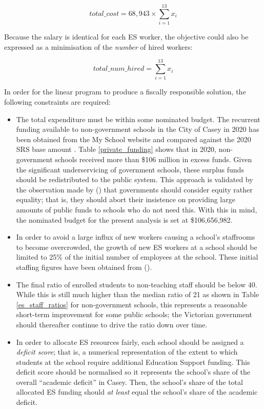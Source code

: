 \documentclass[11pt, a4paper]{article}
\begin{document}
    \begin{equation}
        total\_cost = 68,943 \times \sum_{i=1}^{13} x_i
    \end{equation}

    Because the salary is identical for each ES worker, the objective could also be expressed as a minimisation of the \textit{number} of hired workers:

    \begin{equation}
        total\_num\_hired = \sum_{i=1}^{13} x_i
    \end{equation}

    In order for the linear program to produce a fiscally responsible solution, the following constraints are required:

    \begin{itemize}
        \item The total expenditure must be within some nominated budget. The recurrent funding available to non-government schools in the City of Casey in 2020 has been obtained from the My School website \parencite{naplan} and compared against the 2020 SRS base amount \parencite{srs_2020}. Table \ref{private_funding} shows that in 2020, non-government schools received more than \$106 million in excess funds. Given the significant underservicing of government schools, these surplus funds should be redistributed to the public system. This approach is validated by the observation made by  () that governments should consider equity rather equality; that is, they should abort their insistence on providing large amounts of public funds to schools who do not need this. With this in mind, the nominated budget for the present analysis is set at \$106,656,982.
        \item In order to avoid a large influx of new workers causing a school's staffrooms to become overcrowded, the growth of new ES workers at a school should be limited to 25\% of the initial number of employees at the school. These initial staffing figures have been obtained from  ().
        \item The final ratio of enrolled students to non-teaching staff should be below 40. While this is still much higher than the median ratio of 21 as shown in Table \ref{es_staff_ratios} for non-government schools, this represents a reasonable short-term improvement for some public schools; the Victorian government should thereafter continue to drive the ratio down over time.
        \item In order to allocate ES resources fairly, each school should be assigned a \textit{deficit score}; that is, a numerical representation of the extent to which students at the school require additional Education Support funding. This deficit score should be normalised so it represents the school's share of the overall ``academic deficit'' in Casey. Then, the school's share of the total allocated ES funding should \textit{at least} equal the school's share of the academic deficit.
    \end{itemize}
\end{document}
